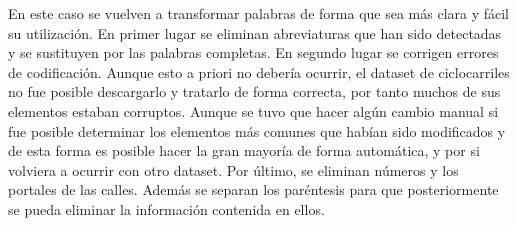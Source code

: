 En este caso se vuelven a transformar palabras de forma que sea más clara y fácil su utilización.
En primer lugar se eliminan abreviaturas que han sido detectadas y se sustituyen por las palabras completas.
\newline
En segundo lugar se corrigen errores de codificación. Aunque esto a priori no debería ocurrir, el dataset de ciclocarriles no fue posible descargarlo y tratarlo de forma correcta, por tanto muchos de sus elementos estaban corruptos. Aunque se tuvo que hacer algún cambio manual si fue posible determinar los elementos más comunes que habían sido modificados y de esta forma es posible hacer la gran mayoría de forma automática, y por si volviera a ocurrir con otro dataset.
\newline
Por último, se eliminan números y los portales de las calles. Además se separan los paréntesis para que posteriormente se pueda eliminar la información contenida en ellos.













